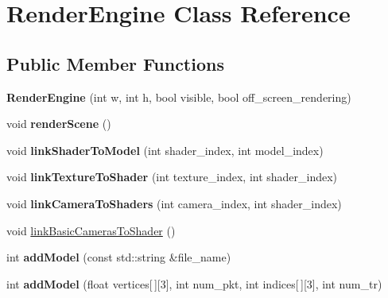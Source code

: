 \hypertarget{classRenderEngine}{\section{Render\-Engine Class Reference}
\label{classRenderEngine}
}
\subsection*{Public Member Functions}
\begin{DoxyCompactItemize}
\item 
\hypertarget{classRenderEngine_a19c1c07a684f30ef9da1ee5ead43d0a9}{{\bfseries Render\-Engine} (int w, int h, bool visible, bool off\-\_\-screen\-\_\-rendering)}\label{classRenderEngine_a19c1c07a684f30ef9da1ee5ead43d0a9}

\item 
\hypertarget{classRenderEngine_a371ddf7250473c2278244c68c63118ef}{void {\bfseries render\-Scene} ()}\label{classRenderEngine_a371ddf7250473c2278244c68c63118ef}

\item 
\hypertarget{classRenderEngine_afdd3f4c46666621d615b9c99c65b5bd5}{void {\bfseries link\-Shader\-To\-Model} (int shader\-\_\-index, int model\-\_\-index)}\label{classRenderEngine_afdd3f4c46666621d615b9c99c65b5bd5}

\item 
\hypertarget{classRenderEngine_afb62db8fbcc33d19b4637c00c7d54e55}{void {\bfseries link\-Texture\-To\-Shader} (int texture\-\_\-index, int shader\-\_\-index)}\label{classRenderEngine_afb62db8fbcc33d19b4637c00c7d54e55}

\item 
\hypertarget{classRenderEngine_af7aa688e340c0e41b34c6dd8809bc714}{void {\bfseries link\-Camera\-To\-Shaders} (int camera\-\_\-index, int shader\-\_\-index)}\label{classRenderEngine_af7aa688e340c0e41b34c6dd8809bc714}

\item 
void \hyperlink{classRenderEngine_adac938029cb6ff91eaa049f2e6123590}{link\-Basic\-Cameras\-To\-Shader} ()
\item 
\hypertarget{classRenderEngine_a30f7fba93bd96f1b81ddb4635961f1b5}{int {\bfseries add\-Model} (const std\-::string \&file\-\_\-name)}\label{classRenderEngine_a30f7fba93bd96f1b81ddb4635961f1b5}

\item 
\hypertarget{classRenderEngine_aca813fc515704267c0a01914d8053622}{int {\bfseries add\-Model} (float vertices\mbox{[}$\,$\mbox{]}\mbox{[}3\mbox{]}, int num\-\_\-pkt, int indices\mbox{[}$\,$\mbox{]}\mbox{[}3\mbox{]}, int num\-\_\-tr)}\label{classRenderEngine_aca813fc515704267c0a01914d8053622}


\end{DoxyCompactItemize}
